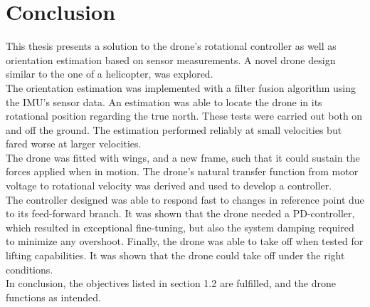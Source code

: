 \chapter{Conclusion}\label{chap:conclusion}

This thesis presents a solution to the drone's rotational controller as well as orientation estimation based on sensor measurements. A novel drone design similar to the one of a helicopter, was explored.\\
The orientation estimation was implemented with a filter fusion algorithm using the IMU's sensor data. An estimation was able to locate the drone in its rotational position regarding the true north. These tests were carried out both on and off the ground. The estimation performed reliably at small velocities but fared worse at larger velocities. \\

The drone was fitted with wings, and a new frame, such that it could sustain the forces applied when in motion.
The drone's natural transfer function from motor voltage to rotational velocity was derived and used to develop a controller.\\
The controller designed was able to respond fast to changes in reference point due to its feed-forward branch. It was shown that the drone needed a PD-controller, which resulted in exceptional fine-tuning, but also the system damping required to minimize any overshoot. 
Finally, the drone was able to take off when tested for lifting capabilities. It was shown that the drone could take off under the right conditions.\\
In conclusion, the objectives listed in section 1.2 are fulfilled, and the drone functions as intended.
